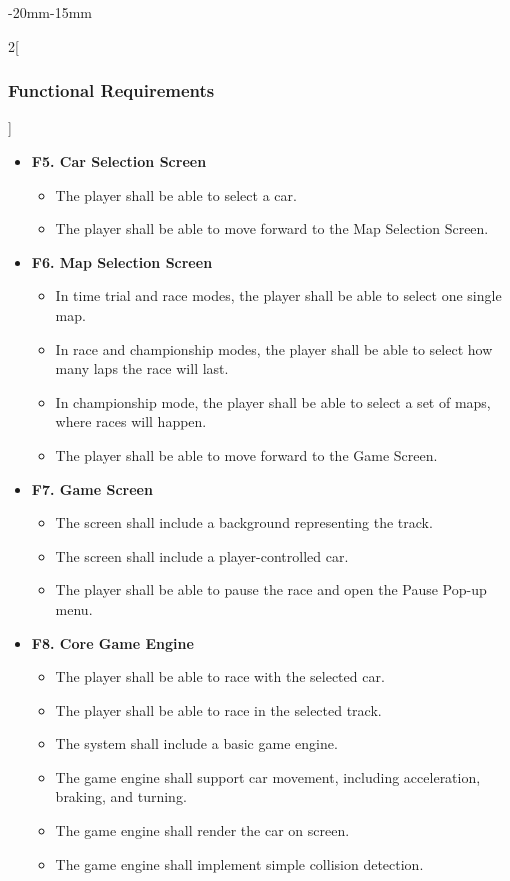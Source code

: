 \documentclass[12pt]{article}
\begin{document}
\begin{adjustwidth}{-20mm}{-15mm}
\begin{multicols}{2}[\subsubsection{Functional Requirements}]
\begin{itemize}[leftmargin=*]
\item \textbf{F5. Car Selection Screen}
\begin{itemize}[leftmargin=*]
\item The player shall be able to select a car.
\item The player shall be able to move forward to the Map Selection Screen.
\end{itemize}

\item \textbf{F6. Map Selection Screen}
\begin{itemize}[leftmargin=*]
\item In time trial and race modes, the player shall be able to select one single map.
\item In race and championship modes, the player shall be able to select how many laps the race will last.
\item In championship mode, the player shall be able to select a set of maps, where races will happen.
\item The player shall be able to move forward to the Game Screen.
\end{itemize}

\item \textbf{F7. Game Screen}
\begin{itemize}[leftmargin=*]
\item The screen shall include a background representing the track.
\item The screen shall include a player-controlled car.
\item The player shall be able to pause the race and open the Pause Pop-up menu.
\end{itemize}

\item \textbf{F8. Core Game Engine}
\begin{itemize}[leftmargin=*]
\item The player shall be able to race with the selected car.
\item The player shall be able to race in the selected track.
\item The system shall include a basic game engine.
\item The game engine shall support car movement, including acceleration, braking, and turning.
\item The game engine shall render the car on screen.
\item The game engine shall implement simple collision detection.
\end{itemize}


\end{itemize}
\end{multicols}
\end{adjustwidth}
\end{document}
